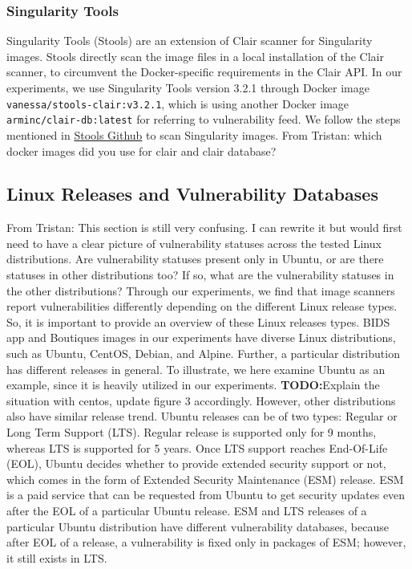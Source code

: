 \documentclass[a4paper,num-refs]{oup-contemporary}
\newcommand{\todo}[1]{\color{red}\textbf{TODO:}#1\color{black}}
\newcommand{\tristan}[1]{\color{blue}From Tristan: #1\color{black}}
\begin{document}
\subsubsection{Singularity Tools}

Singularity Tools (Stools)
are an extension of Clair scanner for Singularity images. Stools
directly scan the image files in a local installation of the Clair
scanner, to circumvent the Docker-specific requirements in the Clair API.
In our experiments, we use Singularity Tools version 3.2.1 through Docker
image
\texttt{vanessa/stools-clair:v3.2.1}, which is using another Docker
image \texttt{arminc/clair-db:latest} for referring to vulnerability feed.
We follow the steps mentioned in
\href{https://github.com/singularityhub/stools}{Stools Github} to scan
Singularity images. \tristan{which docker images did you use for clair and clair database?}

\subsection{Linux Releases and Vulnerability Databases}

\tristan{This section is still very confusing. I can rewrite it but would first need to
have a clear picture of vulnerability statuses across the tested Linux distributions. 
Are vulnerability statuses present only in Ubuntu, or are there statuses in other distributions too?
If so, what are the vulnerability statuses in the other distributions?
}
Through our experiments, we find that image scanners report vulnerabilities 
differently depending on the different Linux release types. So, it is 
important to provide an overview of these Linux releases types. 
BIDS app and Boutiques images in our experiments have diverse Linux
distributions, such as Ubuntu, CentOS, Debian, and Alpine. Further, a particular
distribution has different releases in general. To illustrate, we here examine Ubuntu as an example,
since it is heavily utilized in our experiments. 
\todo{Explain the situation with centos, update figure 3 accordingly.}
However, other distributions also have
similar release trend. Ubuntu releases
can be of two types: Regular or Long Term Support (LTS).
Regular release is supported only for 9 months, whereas LTS is supported for 5 years. Once LTS support
reaches End-Of-Life (EOL), Ubuntu decides whether to provide extended security support or not, which comes
in the form of Extended Security Maintenance (ESM) release.
ESM is a paid service that can be requested from Ubuntu to get security 
updates even after the EOL of a particular Ubuntu release. ESM and LTS releases of a particular Ubuntu distribution have different vulnerability
databases, because after EOL of a release, a vulnerability is fixed only in packages of ESM; however, it still
exists in LTS.
\end{document}
